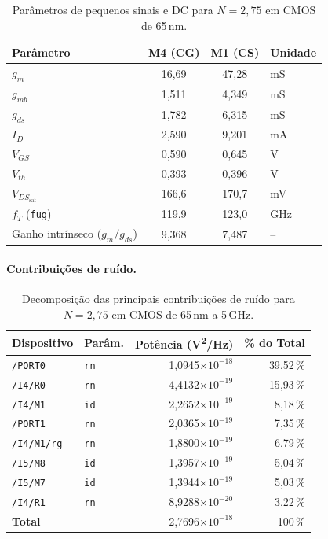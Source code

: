 \begin{table}[H]
\centering
\caption{Parâmetros de pequenos sinais e DC para $N=2{,}75$ em CMOS de 65\,nm.}
\label{tab:op65_N275}
\begin{tabular}{lccl}
\hline
\textbf{Parâmetro} & \textbf{M4 (CG)} & \textbf{M1 (CS)} & \textbf{Unidade} \\
\hline
$g_m$                           & 16{,}69 & 47{,}28 & mS \\
$g_{mb}$                        & 1{,}511 & 4{,}349 & mS \\
$g_{ds}$                        & 1{,}782 & 6{,}315 & mS \\
$I_D$                           & 2{,}590 & 9{,}201 & mA \\
$V_{GS}$                        & 0{,}590 & 0{,}645 & V  \\
$V_{th}$                        & 0{,}393 & 0{,}396 & V  \\
$V_{DS_{\text{sat}}}$           & 166{,}6 & 170{,}7 & mV \\
$f_T$ (\texttt{fug})            & 119{,}9 & 123{,}0 & GHz \\
Ganho intrínseco ($g_m/g_{ds}$) & 9{,}368 & 7{,}487 & --  \\
\hline
\end{tabular}
\end{table}

\paragraph{Contribuições de ruído.}

\begin{table}[H]
\centering
\caption{Decomposição das principais contribuições de ruído para $N=2{,}75$ em CMOS de 65\,nm a
5\,GHz.}
\label{tab:noise65_N275}
\begin{tabular}{llrr}
\hline
\textbf{Dispositivo} & \textbf{Parâm.} & \textbf{Potência (V\textsuperscript{2}/Hz)} & \textbf{\% do Total} \\
\hline
\texttt{/PORT0}    & \texttt{rn} & 1{,}0945$\times 10^{-18}$ & 39{,}52\,\% \\
\texttt{/I4/R0}    & \texttt{rn} & 4{,}4132$\times 10^{-19}$ & 15{,}93\,\% \\
\texttt{/I4/M1}    & \texttt{id} & 2{,}2652$\times 10^{-19}$ & 8{,}18\,\%  \\
\texttt{/PORT1}    & \texttt{rn} & 2{,}0365$\times 10^{-19}$ & 7{,}35\,\%  \\
\texttt{/I4/M1/rg} & \texttt{rn} & 1{,}8800$\times 10^{-19}$ & 6{,}79\,\%  \\
\texttt{/I5/M8}    & \texttt{id} & 1{,}3957$\times 10^{-19}$ & 5{,}04\,\%  \\
\texttt{/I5/M7}    & \texttt{id} & 1{,}3944$\times 10^{-19}$ & 5{,}03\,\%  \\
\texttt{/I4/R1}    & \texttt{rn} & 8{,}9288$\times 10^{-20}$ & 3{,}22\,\%  \\
\hline
\textbf{Total}     &             & 2{,}7696$\times 10^{-18}$ & 100\,\%      \\
\hline
\end{tabular}
\end{table}

